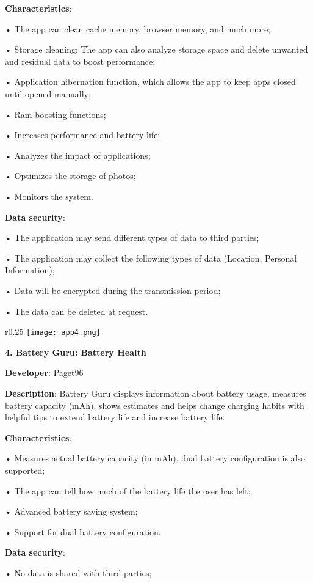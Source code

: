 \textbf{Characteristics}:

• The app can clean cache memory, browser memory, and much more;

• Storage cleaning: The app can also analyze storage space and delete unwanted and residual data to boost performance;

• Application hibernation function, which allows the app to keep apps closed until opened manually;

• Ram boosting functions;

• Increases performance and battery life;

• Analyzes the impact of applications;

• Optimizes the storage of photos;

• Monitors the system.

\textbf{Data security}:

• The application may send different types of data to third parties;

• The application may collect the following types of data (Location, Personal Information);

• Data will be encrypted during the transmission period;

• The data can be deleted at request.\newline

\begin{wrapfigure}{r}{0.25\textwidth} 
    \centering
    \texttt{[image: app4.png]}
\end{wrapfigure}

\noindent 
\textbf{4. Battery Guru: Battery Health }

\textbf{Developer}: Paget96

\textbf{Description}: Battery Guru displays information about battery usage, measures battery capacity (mAh), shows estimates and helps change charging habits with helpful tips to extend battery life and increase battery life.

\textbf{Characteristics}:

• Measures actual battery capacity (in mAh), dual battery configuration is also supported;

• The app can tell how much of the battery life the user has left;

• Advanced battery saving system;

• Support for dual battery configuration.

\textbf{Data security}:

• No data is shared with third parties;

